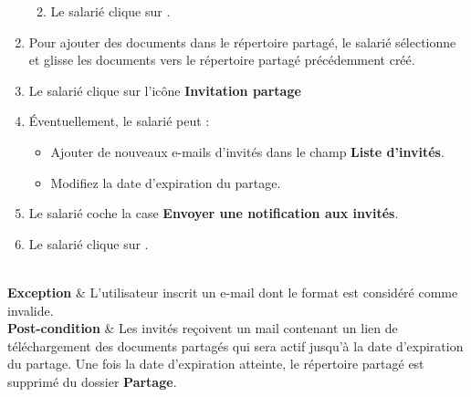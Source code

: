 \begin{longtblr}
\begin{minipage}{\linewidth}
\begin{enumerate}[leftmargin=*]
\begin{enumerate}
\begin{itemize}
        \end{itemize}
        \item Le salarié clique sur .
    \end{enumerate}
    \item Pour ajouter des documents dans le répertoire partagé, le salarié sélectionne et glisse les documents vers le répertoire partagé précédemment créé.
    \item Le salarié clique sur l’icône \textbf{Invitation partage} {\hspace{2pt}}
    \item Éventuellement, le salarié peut :
    \begin{itemize}
        \item Ajouter de nouveaux e-mails d'invités dans le champ \textbf{Liste d’invités}.
        \item Modifiez la date d’expiration du partage.
    \end{itemize}
    \item Le salarié coche la case \textbf{Envoyer une notification aux invités}.
    \item Le salarié clique sur .
\end{enumerate}
\end{minipage}
\\
\textbf{Exception} & 
    L'utilisateur inscrit un e-mail dont le format est considéré comme invalide.\\
\textbf{Post-condition} & 
Les invités reçoivent un mail contenant un lien de téléchargement des documents partagés qui sera actif jusqu’à la date d’expiration du partage. Une fois la date d’expiration atteinte, le répertoire partagé est supprimé du dossier \textbf{Partage}.
\end{longtblr}


